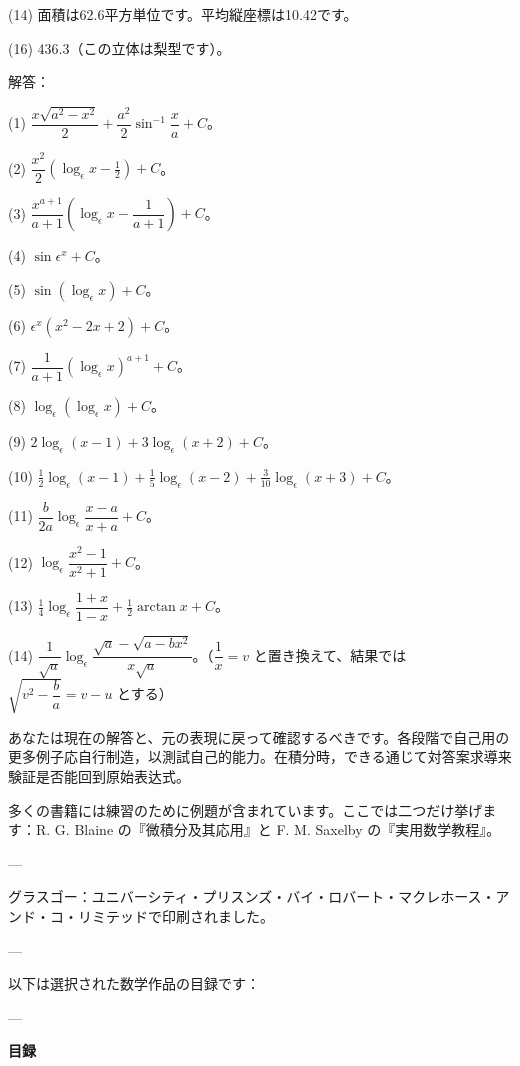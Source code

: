 \documentclass[a4paper,11pt,openany]{ltjsbook}
\begin{document}
\begin{enumerate}
(14) 面積は62.6平方単位です。平均縦座標は10.42です。

(16) 436.3（この立体は梨型です）。

解答：

(1) $\dfrac{x\sqrt{a^2 - x^2}}{2} + \dfrac{a^2}{2} \sin^{-1} \dfrac{x}{a} + C$。

(2) $\dfrac{x^2}{2}(\log_\epsilon x - \tfrac{1}{2}) + C$。

(3) $\dfrac{x^{a+1}}{a + 1} \left(\log_\epsilon x - \dfrac{1}{a + 1}\right) + C$。

(4) $\sin \epsilon^x + C$。

(5) $\sin(\log_\epsilon x) + C$。

(6) $\epsilon^x (x^2 - 2x + 2) + C$。

(7) $\dfrac{1}{a + 1} (\log_\epsilon x)^{a+1} + C$。
 

(8) $\log_\epsilon(\log_\epsilon x) + C$。

(9) $2\log_\epsilon(x - 1) + 3\log_\epsilon(x + 2) + C$。

(10) $\frac{1}{2} \log_\epsilon(x - 1) + \frac{1}{5} \log_\epsilon(x - 2) + \frac{3}{10} \log_\epsilon(x + 3) + C$。

(11) $\dfrac{b}{2a} \log_\epsilon \dfrac{x - a}{x + a} + C$。

(12) $\log_\epsilon \dfrac{x^2 - 1}{x^2 + 1} + C$。

(13) $\frac{1}{4} \log_\epsilon \dfrac{1 + x}{1 - x} + \frac{1}{2} \arctan x + C$。

(14) $\dfrac{1}{\sqrt{a}} \log_\epsilon \dfrac{\sqrt{a} - \sqrt{a - bx^2}}{x\sqrt{a}}$。（$\dfrac{1}{x} = v$ と置き換えて、結果では $\sqrt{v^2 - \dfrac{b}{a}} = v - u$ とする）

あなたは現在の解答と、元の表現に戻って確認するべきです。各段階で自己用の更多例子応自行制造，以測試自己的能力。在積分時，できる通じて対答案求導来験証是否能回到原始表达式。

多くの書籍には練習のために例題が含まれています。ここでは二つだけ挙げます：R. G. Blaine の『微積分及其応用』と F. M. Saxelby の『実用数学教程』。

---

グラスゴー：ユニバーシティ・プリスンズ・バイ・ロバート・マクレホース・アンド・コ・リミテッドで印刷されました。

---

以下は選択された数学作品の目録です：

---

\textbf{目録}


\end{enumerate}
\end{document}
